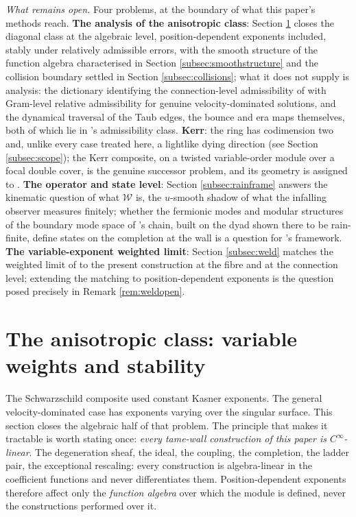 \documentclass[11pt]{article}
\theoremstyle{definition}
\newcommand{\shW}{\mathcal{W}}
\begin{document}
\emph{What remains open.} Four problems, at the boundary of what this paper's methods reach. \textbf{The analysis of the anisotropic class}: Section \ref{sec:anisotropic} closes the diagonal class at the algebraic level, position-dependent exponents included, stably under relatively admissible errors, with the smooth structure of the function algebra characterised in Section \ref{subsec:smoothstructure} and the collision boundary settled in Section \ref{subsec:collisions}; what it does not supply is analysis: the dictionary identifying the connection-level admissibility of \cite{ButlerT6} with Gram-level relative admissibility for genuine velocity-dominated solutions, and the dynamical traversal of the Taub edges, the bounce and era maps themselves, both of which lie in \cite{ButlerT6}'s admissibility class. \textbf{Kerr}: the ring has codimension two and, unlike every case treated here, a lightlike dying direction (see Section \ref{subsec:scope}); the Kerr composite, on a twisted variable-order module over a focal double cover, is the genuine successor problem, and its geometry is assigned to \cite{ButlerT6}. \textbf{The operator and state level}: Section \ref{subsec:rainframe} answers the kinematic question of what $\shW$ is, the $u$-smooth shadow of what the infalling observer measures finitely; whether the fermionic modes and modular structures of the boundary mode space of \cite{ButlerT5}'s chain, built on the dyad shown there to be rain-finite, define states on the completion at the wall is a question for \cite{ButlerT5}'s framework. \textbf{The variable-exponent weighted limit}: Section \ref{subsec:weld} matches the weighted limit of \cite{ButlerT6} to the present construction at the fibre and at the connection level; extending the matching to position-dependent exponents is the question posed precisely in Remark \ref{rem:weldopen}.

\section{The anisotropic class: variable weights and stability}\label{sec:anisotropic}

The Schwarzschild composite used constant Kasner exponents. The general velocity-dominated case has exponents varying over the singular surface. This section closes the algebraic half of that problem. The principle that makes it tractable is worth stating once: \emph{every tame-wall construction of this paper is $C^\infty$-linear}. The degeneration sheaf, the ideal, the coupling, the completion, the ladder pair, the exceptional rescaling: every construction is algebra-linear in the coefficient functions and never differentiates them. Position-dependent exponents therefore affect only the \emph{function algebra} over which the module is defined, never the constructions performed over it.
\end{document}
